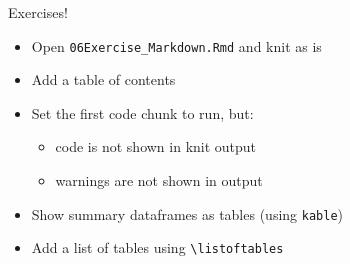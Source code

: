 \documentclass[
  ignorenonframetext,
]{beamer}
\providecommand{\tightlist}{%
  \setlength{\itemsep}{0pt}\setlength{\parskip}{0pt}}
\begin{document}
\begin{frame}[fragile]{Exercises!}
\protect\hypertarget{exercises}{}
\begin{itemize}
\tightlist
\item
  Open \texttt{06Exercise\_Markdown.Rmd} and knit as is
\item
  Add a table of contents
\item
  Set the first code chunk to run, but:

  \begin{itemize}
  \tightlist
  \item
    code is not shown in knit output
  \item
    warnings are not shown in output
  \end{itemize}
\item
  Show summary dataframes as tables (using \texttt{kable})
\item
  Add a list of tables using \texttt{\textbackslash{}listoftables}
\end{itemize}
\end{frame}
\end{document}
